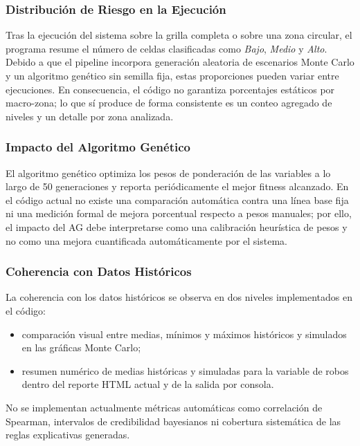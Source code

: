\documentclass[11pt]{article}
\begin{document}
\subsubsection{Distribución de Riesgo en la Ejecución}

Tras la ejecución del sistema sobre la grilla completa o sobre una zona circular, el programa resume el número de celdas clasificadas como \textit{Bajo}, \textit{Medio} y \textit{Alto}. Debido a que el pipeline incorpora generación aleatoria de escenarios Monte Carlo y un algoritmo genético sin semilla fija, estas proporciones pueden variar entre ejecuciones. En consecuencia, el código no garantiza porcentajes estáticos por macro-zona; lo que sí produce de forma consistente es un conteo agregado de niveles y un detalle por zona analizada.

\subsubsection{Impacto del Algoritmo Genético}

El algoritmo genético optimiza los pesos de ponderación de las variables a lo largo de 50 generaciones y reporta periódicamente el mejor fitness alcanzado. En el código actual no existe una comparación automática contra una línea base fija ni una medición formal de mejora porcentual respecto a pesos manuales; por ello, el impacto del AG debe interpretarse como una calibración heurística de pesos y no como una mejora cuantificada automáticamente por el sistema.

\subsubsection{Coherencia con Datos Históricos}

La coherencia con los datos históricos se observa en dos niveles implementados en el código:
\begin{itemize}
    \item comparación visual entre medias, mínimos y máximos históricos y simulados en las gráficas Monte Carlo;
    \item resumen numérico de medias históricas y simuladas para la variable de robos dentro del reporte HTML actual y de la salida por consola.
\end{itemize}

No se implementan actualmente métricas automáticas como correlación de Spearman, intervalos de credibilidad bayesianos ni cobertura sistemática de las reglas explicativas generadas.
\end{document}
